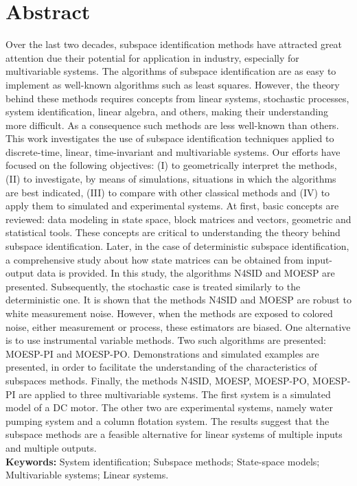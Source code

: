 \chapter*{Abstract}

\vspace{-2cm}Over the last two decades, subspace identification
methods have attracted great attention due their potential for
application in industry, especially for multivariable systems. The
algorithms of subspace identification are as easy to implement as
well-known algorithms such as least squares. However, the theory
behind these methods requires concepts from linear systems,
stochastic processes, system identification, linear algebra, and
others, making their understanding more difficult. As a consequence
such methods are less well-known than others. This work investigates
the use of subspace identification techniques applied to
discrete-time, linear, time-invariant and multivariable systems. Our
efforts have focused on the following objectives: (I) to
geometrically interpret the methods, (II) to investigate, by means
of simulations, situations in which the algorithms are best
indicated, (III) to compare with other classical methods and (IV) to
apply them to simulated and experimental systems. At first, basic
concepts are reviewed: data modeling in state space, block matrices
and vectors, geometric and statistical tools. These concepts are
critical to understanding the theory behind subspace identification.
Later, in the case of deterministic subspace identification, a
comprehensive study about how state matrices can be obtained from
input-output data is provided. In this study, the algorithms N4SID
and MOESP are presented. Subsequently, the stochastic case is
treated similarly to the deterministic one. It is shown that the
methods N4SID and MOESP are robust to white measurement noise.
However, when the methods are exposed to colored noise, either
measurement or process, these estimators are biased. One alternative
is to use instrumental variable methods. Two such algorithms are
presented: MOESP-PI and MOESP-PO. Demonstrations and simulated
examples are presented, in order to facilitate the understanding of
the characteristics of subspaces methods. Finally, the methods
N4SID, MOESP, MOESP-PO, MOESP-PI are applied to three multivariable
systems. The first system is a simulated model of a DC motor. The
other two are experimental systems, namely water pumping system and
a column flotation system. The results suggest that the subspace
methods are a feasible alternative for linear systems of multiple
inputs and multiple outputs.
\\

\textbf{Keywords:} System identification; Subspace methods;
State-space models; Multivariable systems; Linear systems.
